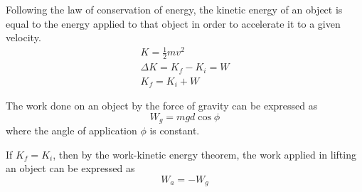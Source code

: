 \documentclass{article}
\begin{document}
    \medskip\noindent
    Following the law of conservation of energy, the kinetic energy of an object is equal to the energy applied to that object in order to accelerate it to a given velocity.
    \vspace{-1em}
    \begin{gather*}
        K=\frac{1}{2}mv^2                   \\
        \Delta K = K_f - K_i = W            \\[.3em]
        K_f = K_i + W
    \end{gather*}

    \medskip\noindent
    The work done on an object by the force of gravity can be expressed as
    \[
        W_g = mgd\cos\phi
    \]
    \noindent
    where the angle of application $\phi$ is constant.

    \medskip\noindent
    If $K_f=K_i$, then by the work-kinetic energy theorem, the work applied in lifting an object can be expressed as
    \[
        W_a = -W_g
    \]
\end{document}
